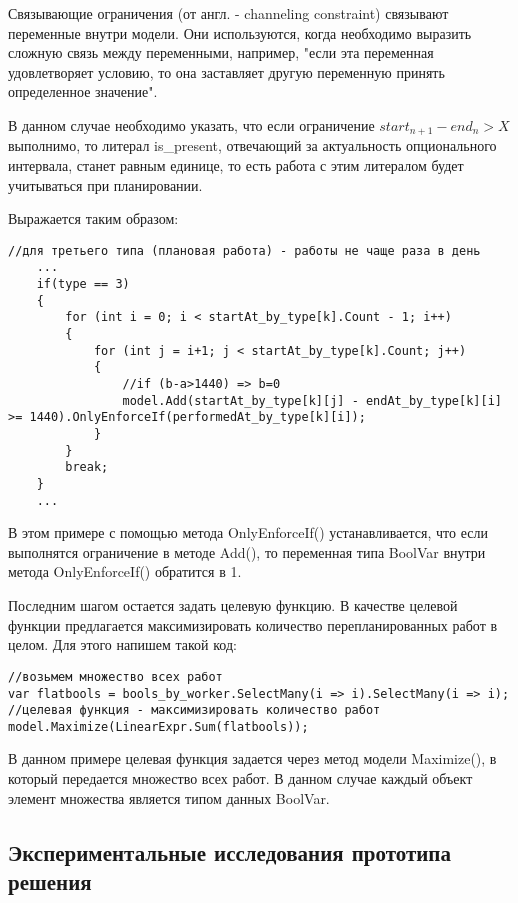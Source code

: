 Связывающие ограничения (от англ. - channeling constraint) связывают переменные внутри модели. Они используются, когда необходимо выразить сложную связь между переменными, например, "если эта переменная удовлетворяет условию, то она заставляет другую переменную принять определенное значение".

В данном случае необходимо указать, что если ограничение $start_{n+1} - end_n > X$ выполнимо, то литерал is\_present, отвечающий за актуальность опционального интервала, станет равным единице, то есть работа с этим литералом будет учитываться при планировании.

Выражается таким образом:

\begin{verbatim}
//для третьего типа (плановая работа) - работы не чаще раза в день
    ...
    if(type == 3)
    {
        for (int i = 0; i < startAt_by_type[k].Count - 1; i++)
        {
            for (int j = i+1; j < startAt_by_type[k].Count; j++)
            {
                //if (b-a>1440) => b=0
                model.Add(startAt_by_type[k][j] - endAt_by_type[k][i] >= 1440).OnlyEnforceIf(performedAt_by_type[k][i]);
            }
        }
        break;
    }
    ...    
\end{verbatim}

В этом примере с помощью метода OnlyEnforceIf() устанавливается, что если выполнятся ограничение в методе Add(), то переменная типа BoolVar внутри метода OnlyEnforceIf() обратится в 1.

Последним шагом остается задать целевую функцию. В качестве целевой функции предлагается максимизировать количество перепланированных работ в целом. Для этого напишем такой код:

\begin{verbatim}
//возьмем множество всех работ
var flatbools = bools_by_worker.SelectMany(i => i).SelectMany(i => i);
//целевая функция - максимизировать количество работ
model.Maximize(LinearExpr.Sum(flatbools));
\end{verbatim}

В данном примере целевая функция задается через метод модели Maximize(), в который передается множество всех работ. В данном случае каждый объект элемент множества является типом данных BoolVar.


\subsection{Экспериментальные исследования прототипа решения}

\clearpage
